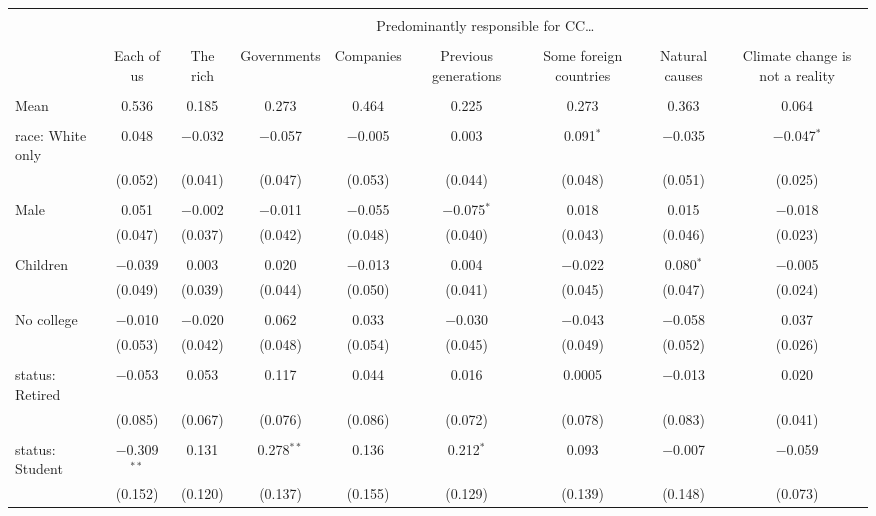 
\begin{tabular}{@{\extracolsep{5pt}}lcccccccc} 
\\[-1.8ex]\hline 
\hline \\[-1.8ex] 
 & \multicolumn{8}{c}{Predominantly responsible for CC…} \\ 
\cline{2-9} 
\\[-1.8ex] & Each of us & The rich & Governments & Companies & Previous generations & Some foreign countries & Natural causes & Climate change is not a reality \\ 
\hline \\[-1.8ex] 
 Mean & 0.536 & 0.185 & 0.273 & 0.464 & 0.225 & 0.273 & 0.363 & 0.064  \\ \hline \\[-1.8ex] race: White only & 0.048 & $-$0.032 & $-$0.057 & $-$0.005 & 0.003 & 0.091$^{*}$ & $-$0.035 & $-$0.047$^{*}$ \\ 
  & (0.052) & (0.041) & (0.047) & (0.053) & (0.044) & (0.048) & (0.051) & (0.025) \\ 
  & & & & & & & & \\ 
 Male & 0.051 & $-$0.002 & $-$0.011 & $-$0.055 & $-$0.075$^{*}$ & 0.018 & 0.015 & $-$0.018 \\ 
  & (0.047) & (0.037) & (0.042) & (0.048) & (0.040) & (0.043) & (0.046) & (0.023) \\ 
  & & & & & & & & \\ 
 Children & $-$0.039 & 0.003 & 0.020 & $-$0.013 & 0.004 & $-$0.022 & 0.080$^{*}$ & $-$0.005 \\ 
  & (0.049) & (0.039) & (0.044) & (0.050) & (0.041) & (0.045) & (0.047) & (0.024) \\ 
  & & & & & & & & \\ 
 No college & $-$0.010 & $-$0.020 & 0.062 & 0.033 & $-$0.030 & $-$0.043 & $-$0.058 & 0.037 \\ 
  & (0.053) & (0.042) & (0.048) & (0.054) & (0.045) & (0.049) & (0.052) & (0.026) \\ 
  & & & & & & & & \\ 
 status: Retired & $-$0.053 & 0.053 & 0.117 & 0.044 & 0.016 & 0.0005 & $-$0.013 & 0.020 \\ 
  & (0.085) & (0.067) & (0.076) & (0.086) & (0.072) & (0.078) & (0.083) & (0.041) \\ 
  & & & & & & & & \\ 
 status: Student & $-$0.309$^{**}$ & 0.131 & 0.278$^{**}$ & 0.136 & 0.212$^{*}$ & 0.093 & $-$0.007 & $-$0.059 \\ 
  & (0.152) & (0.120) & (0.137) & (0.155) & (0.129) & (0.139) & (0.148) & (0.073) \\ 

\end{tabular}
